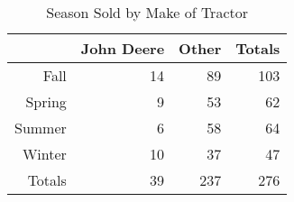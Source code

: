 \begin{table}[ht]
\centering
\begin{tabular}{rrrr}
  \hline
 & John Deere & Other & Totals \\ 
  \hline
Fall & 14 & 89 & 103 \\ 
  Spring & 9 & 53 & 62 \\ 
  Summer & 6 & 58 & 64 \\ 
  Winter & 10 & 37 & 47 \\ 
  Totals & 39 & 237 & 276 \\ 
   \hline
\end{tabular}
\caption{Season Sold by Make of Tractor} 
\label{tab:season_sold_by_make}
\end{table}
